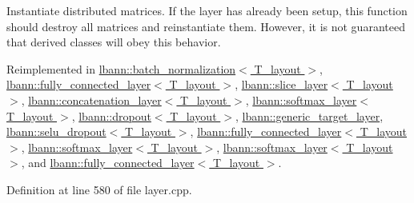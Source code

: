 Instantiate distributed matrices. If the layer has already been setup, this function should destroy all matrices and reinstantiate them. However, it is not guaranteed that derived classes will obey this behavior. 

Reimplemented in \hyperlink{classlbann_1_1batch__normalization_a4ddf27efaf48f0726dc4356a3a0b40a9}{lbann\+::batch\+\_\+normalization$<$ T\+\_\+layout $>$}, \hyperlink{classlbann_1_1fully__connected__layer_a4f26e5923a82f11c2c7658a27903f83b}{lbann\+::fully\+\_\+connected\+\_\+layer$<$ T\+\_\+layout $>$}, \hyperlink{classlbann_1_1slice__layer_af3b6f79a53c9a80908b37c2587ff2cae}{lbann\+::slice\+\_\+layer$<$ T\+\_\+layout $>$}, \hyperlink{classlbann_1_1concatenation__layer_a9c305ea0cbee1b7b6fe822f514c48d42}{lbann\+::concatenation\+\_\+layer$<$ T\+\_\+layout $>$}, \hyperlink{classlbann_1_1softmax__layer_af07463a1d99832d3bf11610311fd7da4}{lbann\+::softmax\+\_\+layer$<$ T\+\_\+layout $>$}, \hyperlink{classlbann_1_1dropout_abf399d8463721d322aedbb76d60534c6}{lbann\+::dropout$<$ T\+\_\+layout $>$}, \hyperlink{classlbann_1_1generic__target__layer_af8bcdbd313c9793187fe6e53396e3356}{lbann\+::generic\+\_\+target\+\_\+layer}, \hyperlink{classlbann_1_1selu__dropout_a8b6469a14cf093d48e42384aa4ee404a}{lbann\+::selu\+\_\+dropout$<$ T\+\_\+layout $>$}, \hyperlink{classlbann_1_1fully__connected__layer_a9af60f901a84d5604badf078ecbae082}{lbann\+::fully\+\_\+connected\+\_\+layer$<$ T\+\_\+layout $>$}, \hyperlink{classlbann_1_1softmax__layer_ae9472c4f1d22ff51cb7508d17e37c61d}{lbann\+::softmax\+\_\+layer$<$ T\+\_\+layout $>$}, \hyperlink{classlbann_1_1softmax__layer_ad011596d678ba62d3a92b0e9b2acae54}{lbann\+::softmax\+\_\+layer$<$ T\+\_\+layout $>$}, and \hyperlink{classlbann_1_1fully__connected__layer_a1f0ae7a5f172e5ced011eaa2755fd04e}{lbann\+::fully\+\_\+connected\+\_\+layer$<$ T\+\_\+layout $>$}.



Definition at line 580 of file layer.\+cpp.


